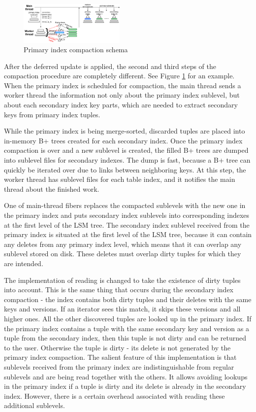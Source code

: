 \documentclass{vldb}
\begin{document}
\begin{figure}
\centering
\includegraphics[width=0.46\textwidth]{compaction_implementation}
\caption{Primary index compaction schema}
\label{fig:compaction_implementation}
\end{figure}
After the deferred update is applied, the second and third steps of the compaction
procedure are completely different. See Figure
\ref{fig:compaction_implementation} for an example. When the primary index is
scheduled for compaction, the main thread sends a worker thread the information
not only about the primary index sublevel, but about each secondary index key parts,
which are needed to extract secondary keys from primary index tuples.

While the primary index is being merge-sorted, discarded tuples are placed into
in-memory B+ trees created for each secondary index. Once the
primary index compaction is over and a new sublevel is created, the filled
B+ trees are dumped into sublevel files for secondary indexes.
The dump is fast, because a B+ tree can quickly be iterated over due to
links between neighboring keys. At this step, the worker thread has sublevel files
for each table index, and it notifies the main thread about the finished work.

One of main-thread fibers replaces the compacted sublevels with the new one in the
primary index and puts secondary index sublevels into corresponding indexes
at the first level of the LSM tree. The secondary index sublevel received from the primary
index is situated at the first level of the LSM tree, because it can contain any deletes from
any primary index level, which means that it can overlap any sublevel stored on disk.
These deletes must overlap dirty tuples for which they are intended.

The implementation of reading is changed to take the existence of dirty tuples
into account. This is the same thing that occurs during the secondary index compaction -
the index contains both dirty tuples and their deletes with the same keys and
versions. If an iterator sees this match, it skips these versions and all higher ones.
All the other discovered tuples are looked up in the primary index. If the primary index
contains a tuple with the same secondary key and version as a tuple from
the secondary index, then this tuple is not dirty and can be returned to the
user. Otherwise the tuple is dirty - its delete is not generated by the primary
index compaction. The salient feature of this implementation is that sublevels
received from the primary index are indistinguishable from regular sublevels and
are being read together with the others. It allows avoiding lookups in the
primary index if a tuple is dirty and its delete is already in the secondary
index. However, there is a certain overhead associated with reading these
additional sublevels.
\end{document}

